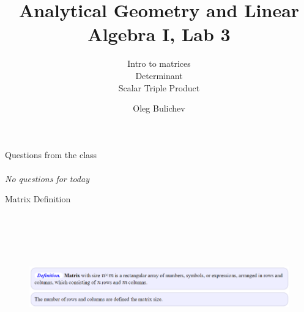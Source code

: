 \documentclass[aspectratio=169,notes]{beamer}
\title[AGLA1]{Analytical Geometry and Linear Algebra I, Lab 3} %
\subtitle{Intro to matrices \\ Determinant  \\ Scalar Triple Product  
         } %
\author{Oleg Bulichev}
\newcommand{\fbckg}[1]{\usebackgroundtemplate{\texttt{[image: \#1]}}}%
\begin{document}
\setlength{\abovedisplayskip}{0pt}
\setlength{\belowdisplayskip}{0pt}
\setlength{\abovedisplayshortskip}{0pt}
\setlength{\belowdisplayshortskip}{0pt}

\fbckg{fibeamer/figs/title_page.png}

\fbckg{fibeamer/figs/common.png}

\begin{frame}[c]{Questions from the class}
\framesubtitle{}
\centering
    \textit{ \Large No questions for today}
\end{frame}

\fbckg{resources/what_is_the_matrix.png}
\frame[plain]{}
\fbckg{fibeamer/figs/common.png}

\begin{frame}[t]{Matrix Definition}
\framesubtitle{}
    \begin{figure}[H]
        \centering\includegraphics[height=6cm,width=1\textwidth,keepaspectratio]{matrix_def.png}
        \label{fig:matrix_def.png}
    \end{figure}
\end{frame}
\end{document}
